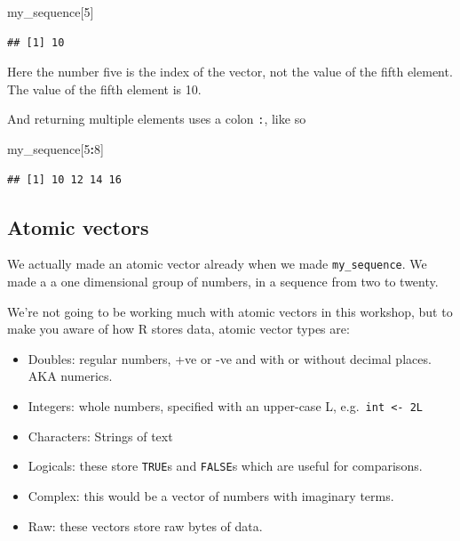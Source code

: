 \documentclass[12pt,]{book}
\newenvironment{Shaded}{\begin{snugshade}}{\end{snugshade}}
\newcommand{\DecValTok}[1]{\textcolor[rgb]{0.00,0.00,0.81}{#1}}
\newcommand{\NormalTok}[1]{#1}
\newcommand{\OperatorTok}[1]{\textcolor[rgb]{0.81,0.36,0.00}{\textbf{#1}}}
\providecommand{\tightlist}{%
  \setlength{\itemsep}{0pt}\setlength{\parskip}{0pt}}
\begin{document}
\begin{Shaded}
\begin{Highlighting}[]
\NormalTok{my_sequence[}\DecValTok{5}\NormalTok{]}
\end{Highlighting}
\end{Shaded}

\begin{verbatim}
## [1] 10
\end{verbatim}

Here the number five is the index of the vector, not the value of the fifth element. The value of the fifth element is 10.

And returning multiple elements uses a colon \texttt{:}, like so

\begin{Shaded}
\begin{Highlighting}[]
\NormalTok{my_sequence[}\DecValTok{5}\OperatorTok{:}\DecValTok{8}\NormalTok{]}
\end{Highlighting}
\end{Shaded}

\begin{verbatim}
## [1] 10 12 14 16
\end{verbatim}

\hypertarget{atomics}{%
\subsection{Atomic vectors}\label{atomics}}

We actually made an atomic vector already when we made \texttt{my\_sequence}. We made a
a one dimensional group of numbers, in a sequence from two to twenty.

We're not going to be working much with atomic vectors in this workshop,
but to make you aware of how R stores data, atomic vector types
are:

\begin{itemize}
\tightlist
\item
  Doubles: regular numbers, +ve or -ve and with or without decimal places. AKA numerics.
\item
  Integers: whole numbers, specified with an upper-case L, e.g.~\texttt{int\ \textless{}-\ 2L}
\item
  Characters: Strings of text
\item
  Logicals: these store \texttt{TRUE}s and \texttt{FALSE}s which are useful for comparisons.
\item
  Complex: this would be a vector of numbers with imaginary terms.
\item
  Raw: these vectors store raw bytes of data.
\end{itemize}
\end{document}
